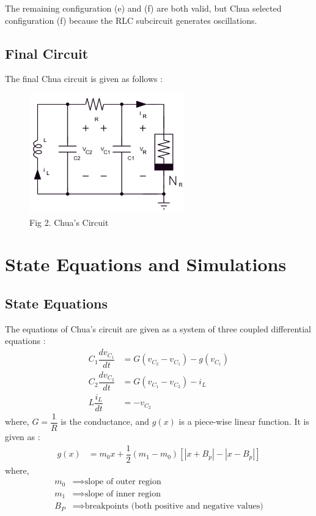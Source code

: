 \documentclass[12pt]{article}
\begin{document}
The remaining configuration (e) and (f) are both valid, but Chua selected configuration (f) because the RLC subcircuit generates oscillations.
%
\subsection{Final Circuit}
The final Chua circuit is given as follows :
\begin{figure}[H]
	\centering
	\includegraphics[width=0.6\textwidth]{Images/fig2_final.png}
	\caption{Fig 2. Chua's Circuit}
\end{figure}
%
\section{State Equations and Simulations}
\subsection{State Equations}
The equations of Chua's circuit are given as a system of three coupled differential equations :
\begin{align}
	C_1 \dfrac{dv_{C_1}}{dt}&=G\left( v_{C_2}-v_{C_1} \right)-g(v_{C_1}) \label{eq:1} \\
	C_2 \dfrac{dv_{C_2}}{dt}&=G\left( v_{C_1}-v_{C_2} \right)-i_L \label{eq:2}\\
	L \dfrac{i_L}{dt}&=-v_{C_2}\label{eq:3}
\end{align}
where, $G=\dfrac{1}{R}$ is the conductance, and $g(x)$ is a piece-wise linear function. It is given as :
\begin{align}
	g(x)&=m_0x+\dfrac{1}{2}(m_1-m_0)\left[ |x+B_p|-|x-B_p| \right] \label{eq:4}
\end{align}
where,
\begin{align*}
	m_0 &\implies \text{slope of outer region} \\
	m_1 &\implies \text{slope of inner region} \\
	B_P &\implies \text{breakpoints (both positive and negative values)}
\end{align*}
%
\end{document}
